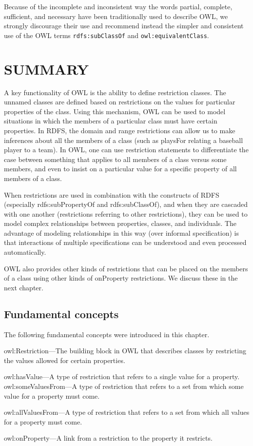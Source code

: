 Because of the incomplete and inconsistent way the words partial,
complete, sufficient, and necessary have been traditionally used to
describe OWL, we strongly discourage their use and recommend instead the
simpler and consistent use of the OWL terms \texttt{rdfs:subClassOf} and
\texttt{owl:equivalentClass}.

\section{SUMMARY}

A key functionality of OWL is the ability to define restriction classes.
The unnamed classes are defined based on restrictions on the values for
particular properties of the class. Using this mechanism, OWL can be
used to model situations in which the members of a particular class must
have certain properties. In RDFS, the domain and range restrictions can
allow us to make inferences about all the members of a class (such as
playsFor relating a baseball player to a team). In OWL, one can use
restriction statements to differentiate the case between something that
applies to all members of a class versus some members, and even to
insist on a particular value for a specific property of all members of a
class.

When restrictions are used in combination with the constructs of RDFS
(especially rdfs:subPropertyOf and rdfs:subClassOf), and when they are
cascaded with one another (restrictions referring to other
restrictions), they can be used to model complex relationships between
properties, classes, and individuals. The advantage of modeling
relationships in this way (over informal specification) is that
interactions of multiple specifications can be understood and even
processed automatically.

OWL also provides other kinds of restrictions that can be placed on the
members of a class using other kinds of onProperty restrictions. We
discuss these in the next chapter.

\subsection{Fundamental concepts}

The following fundamental concepts were introduced in this chapter.

owl:Restriction---The building block in OWL that describes classes by
restricting the values allowed for certain properties.

owl:hasValue---A type of restriction that refers to a single value for a
property. owl:someValuesFrom---A type of restriction that refers to a
set from which some value for a property must come.

owl:allValuesFrom---A type of restriction that refers to a set from
which all values for a property must come.

owl:onProperty---A link from a restriction to the property it restricts.

